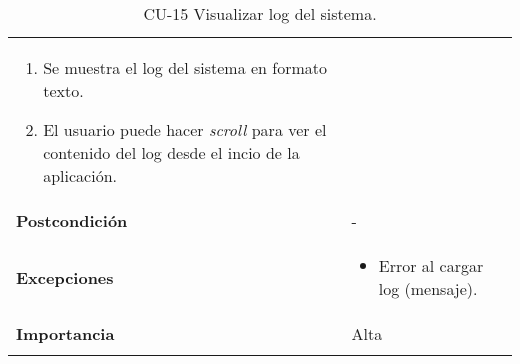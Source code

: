 \begin{longtable}[h!]{@{}ll@{}}
\begin{minipage}[t]{0.71\columnwidth}
\begin{enumerate}
\def\labelenumi{\arabic{enumi}.}
\tightlist
\item
  Se muestra el log del sistema en formato texto.
\item
  El usuario puede hacer \textit{scroll} para ver el contenido del log desde el incio de la aplicación.
\end{enumerate}\strut
\end{minipage}\tabularnewline
\begin{minipage}[t]{0.23\columnwidth}\raggedright\strut
\textbf{Postcondición}\strut
\end{minipage} & \begin{minipage}[t]{0.71\columnwidth}\raggedright\strut
-\strut
\end{minipage}\tabularnewline
\begin{minipage}[t]{0.23\columnwidth}\raggedright\strut
\textbf{Excepciones}\strut
\end{minipage} & \begin{minipage}[t]{0.71\columnwidth}\raggedright\strut
\begin{itemize}
\tightlist
\item
  Error al cargar log (mensaje).
\end{itemize}\strut
\end{minipage}\tabularnewline
\begin{minipage}[t]{0.23\columnwidth}\raggedright\strut
\textbf{Importancia}\strut
\end{minipage} & \begin{minipage}[t]{0.71\columnwidth}\raggedright\strut
Alta\strut
\end{minipage}\tabularnewline
\bottomrule
\caption{CU-15 Visualizar log del sistema.}
\end{longtable}
